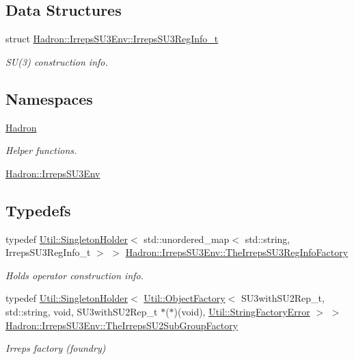 \subsection*{Data Structures}
\begin{DoxyCompactItemize}
\item 
struct \mbox{\hyperlink{structHadron_1_1IrrepsSU3Env_1_1IrrepsSU3RegInfo__t}{Hadron\+::\+Irreps\+S\+U3\+Env\+::\+Irreps\+S\+U3\+Reg\+Info\+\_\+t}}
\begin{DoxyCompactList}\small\item\em S\+U(3) construction info. \end{DoxyCompactList}\end{DoxyCompactItemize}
\subsection*{Namespaces}
\begin{DoxyCompactItemize}
\item 
 \mbox{\hyperlink{namespaceHadron}{Hadron}}
\begin{DoxyCompactList}\small\item\em Helper functions. \end{DoxyCompactList}\item 
 \mbox{\hyperlink{namespaceHadron_1_1IrrepsSU3Env}{Hadron\+::\+Irreps\+S\+U3\+Env}}
\end{DoxyCompactItemize}
\subsection*{Typedefs}
\begin{DoxyCompactItemize}
\item 
typedef \mbox{\hyperlink{classUtil_1_1SingletonHolder}{Util\+::\+Singleton\+Holder}}$<$ std\+::unordered\+\_\+map$<$ std\+::string, Irreps\+S\+U3\+Reg\+Info\+\_\+t $>$ $>$ \mbox{\hyperlink{namespaceHadron_1_1IrrepsSU3Env_afae3999d49fb44dd4174d52c7857e0a0}{Hadron\+::\+Irreps\+S\+U3\+Env\+::\+The\+Irreps\+S\+U3\+Reg\+Info\+Factory}}
\begin{DoxyCompactList}\small\item\em Holds operator construction info. \end{DoxyCompactList}\item 
typedef \mbox{\hyperlink{classUtil_1_1SingletonHolder}{Util\+::\+Singleton\+Holder}}$<$ \mbox{\hyperlink{classUtil_1_1ObjectFactory}{Util\+::\+Object\+Factory}}$<$ S\+U3with\+S\+U2\+Rep\+\_\+t, std\+::string, void, S\+U3with\+S\+U2\+Rep\+\_\+t $\ast$($\ast$)(void), \mbox{\hyperlink{structUtil_1_1StringFactoryError}{Util\+::\+String\+Factory\+Error}} $>$ $>$ \mbox{\hyperlink{namespaceHadron_1_1IrrepsSU3Env_a9181cfdbbaf06ae969f8608df49cdd7b}{Hadron\+::\+Irreps\+S\+U3\+Env\+::\+The\+Irreps\+S\+U2\+Sub\+Group\+Factory}}
\begin{DoxyCompactList}\small\item\em Irreps factory (foundry) \end{DoxyCompactList}\end{DoxyCompactItemize}
